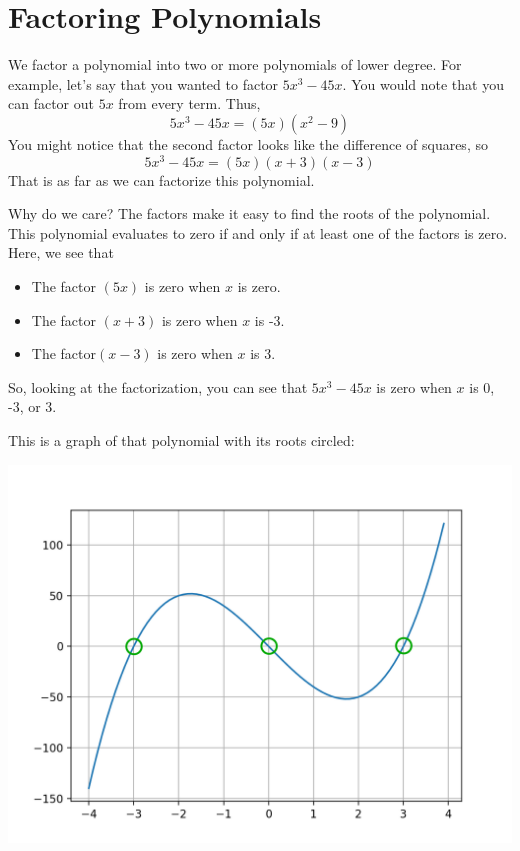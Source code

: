 \chapter{Factoring Polynomials}

We factor a polynomial into two or more polynomials of lower
degree. For example, let's say that you wanted to factor
$5x^3 - 45x$. You would note that you can factor out $5x$ from every term. Thus,
\begin{equation*}
5x^3 - 45x = (5x)(x^2 - 9)
\end{equation*}
You might notice that the second factor looks like the difference of squares, so
\begin{equation*}
5x^3 - 45x = (5x)(x + 3)(x - 3)
\end{equation*}
That is as far as we can factorize this polynomial.

Why do we care? The factors make it easy to find the roots of the
polynomial. This polynomial evaluates to zero if and only if at least
one of the factors is zero. Here, we see that
\begin{itemize}
\item The factor $(5x)$ is zero when $x$ is zero.
\item The factor $(x + 3)$ is zero when $x$ is -3.
\item The factor$(x - 3)$ is zero when $x$ is 3.
\end{itemize}
So, looking at the factorization, you can see
that $5x^3 - 45x$ is zero when $x$ is 0, -3, or 3. 

This is a graph of that polynomial with its roots circled:

\includegraphics{factor4roots.png}


